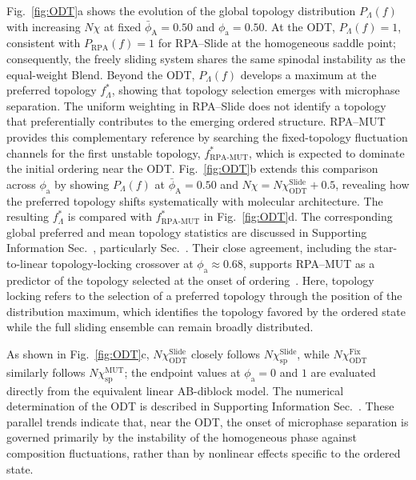 Fig.~\ref{fig:ODT}a shows the evolution of the global topology distribution $P_\Lambda(f)$ with increasing $N\chi$ at fixed $\bar{\phi}_{\mathrm A}=0.50$ and $\phi_{\mathrm a}=0.50$.
At the ODT, $P_\Lambda(f)=1$, consistent with $P_{\mathrm{RPA}}(f)=1$ for RPA--Slide at the homogeneous saddle point; consequently, the freely sliding system shares the same spinodal instability as the equal-weight Blend.
Beyond the ODT, $P_\Lambda(f)$ develops a maximum at the preferred topology $f_\Lambda^\ast$, showing that topology selection emerges with microphase separation.
The uniform weighting in RPA--Slide does not identify a topology that preferentially contributes to the emerging ordered structure.
RPA--MUT provides this complementary reference by searching the fixed-topology fluctuation channels for the first unstable topology, $f_{\mathrm{RPA\text{-}MUT}}^\ast$, which is expected to dominate the initial ordering near the ODT.
Fig.~\ref{fig:ODT}b extends this comparison across $\phi_{\mathrm a}$ by showing $P_\Lambda(f)$ at $\bar{\phi}_{\mathrm A}=0.50$ and $N\chi=N\chi_{\mathrm{ODT}}^{\mathrm{Slide}}+0.5$, revealing how the preferred topology shifts systematically with molecular architecture.
The resulting $f_\Lambda^\ast$ is compared with $f_{\mathrm{RPA\text{-}MUT}}^\ast$ in Fig.~\ref{fig:ODT}d.
The corresponding global preferred and mean topology statistics are discussed in Supporting Information Sec.~, particularly Sec.~.
Their close agreement, including the star-to-linear topology-locking crossover at $\phi_{\mathrm a}\approx0.68$, supports RPA--MUT as a predictor of the topology selected at the onset of ordering~\cite{Zhao2024Phase}. 
Here, topology locking refers to the selection of a preferred topology through the position of the distribution maximum, which identifies the topology favored by the ordered state while the full sliding ensemble can remain broadly distributed.



As shown in Fig.~\ref{fig:ODT}c, $N\chi_{\mathrm{ODT}}^{\mathrm{Slide}}$ closely follows $N\chi_{\mathrm{sp}}^{\mathrm{Slide}}$, while $N\chi_{\mathrm{ODT}}^{\mathrm{Fix}}$ similarly follows $N\chi_{\mathrm{sp}}^{\mathrm{MUT}}$; the endpoint values at $\phi_{\mathrm a}=0$ and $1$ are evaluated directly from the equivalent linear AB-diblock model. 
The numerical determination of the ODT is described in Supporting Information Sec.~.
 These parallel trends indicate that, near the ODT, the onset of microphase separation is governed primarily by the instability of the homogeneous phase against composition fluctuations, rather than by nonlinear effects specific to the ordered state. 

